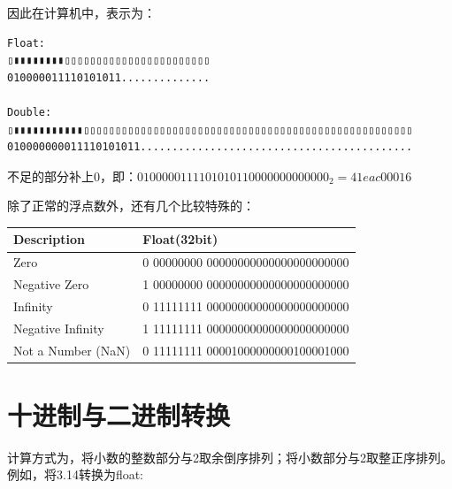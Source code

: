 \documentclass[12pt]{article}
\begin{document}
因此在计算机中，表示为：

\begin{verbatim}
Float:
▯▮▮▮▮▮▮▮▮▯▯▯▯▯▯▯▯▯▯▯▯▯▯▯▯▯▯▯▯▯▯▯
010000011110101011..............

Double:
▯▮▮▮▮▮▮▮▮▮▮▮▯▯▯▯▯▯▯▯▯▯▯▯▯▯▯▯▯▯▯▯▯▯▯▯▯▯▯▯▯▯▯▯▯▯▯▯▯▯▯▯▯▯▯▯▯▯▯▯▯▯▯▯
010000000011110101011...........................................
\end{verbatim}

不足的部分补上0，即：\(0100000111101010110000000000000_{2}=41eac000{16}\)

除了正常的浮点数外，还有几个比较特殊的：

{\def\LTcaptype{none} %
\begin{longtable}[]{@{}ll@{}}
\toprule\noalign{}
Description & Float(32bit) \\
\midrule\noalign{}
\endhead
\bottomrule\noalign{}
\endlastfoot
Zero & 0 00000000 00000000000000000000000 \\
Negative Zero & 1 00000000 00000000000000000000000 \\
Infinity & 0 11111111 00000000000000000000000 \\
Negative Infinity & 1 11111111 00000000000000000000000 \\
Not a Number (NaN) & 0 11111111 00001000000000100001000 \\
\end{longtable}
}

\section{十进制与二进制转换}\label{ux5341ux8fdbux5236ux4e0eux4e8cux8fdbux5236ux8f6cux6362}

计算方式为，将小数的整数部分与2取余倒序排列；将小数部分与2取整正序排列。例如，将3.14转换为float:
\end{document}
